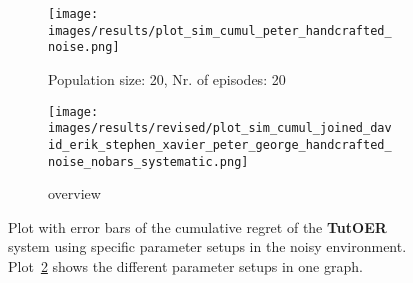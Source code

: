 \begin{figure}[ht]
\begin{subfigure}{0.48\linewidth}
	\texttt{[image: images/results/plot\_sim\_cumul\_peter\_handcrafted\_noise.png]}
	\caption{Population size: 20, Nr. of episodes: 20}
	\label{fig:cumul_handcrafted_noise_peter}
	\end{subfigure}
	\begin{subfigure}{\linewidth}
	\texttt{[image: images/results/revised/plot\_sim\_cumul\_joined\_david\_erik\_stephen\_xavier\_peter\_george\_handcrafted\_noise\_nobars\_systematic.png]}
	\caption{overview}
	\label{fig:cumul_handcrafted_noise_overview_group1}
	\end{subfigure}
	\caption[Cumulative regret in noisy simulated environment for group 1]{Plot with error bars of the cumulative regret of the \textbf{TutOER}
	system using specific parameter setups in the noisy environment.
	Plot~\ref{fig:cumul_handcrafted_noise_overview_group1} shows the
	different parameter setups in one graph.}
	\label{fig:cumul_handcrafted_noise_container_group1}
\end{figure}


